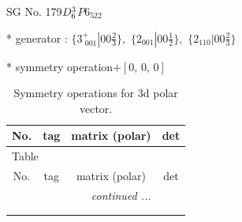 \documentclass[fleqn,8pt]{jsarticle}
\begin{document}
\setcounter{MaxMatrixCols}{32}

\renewcommand{\tablename}{Table~}
\renewcommand{\figurename}{Figure~}
\begin{center}
\LARGE
SG No. 179\quad$D_{\rm 6}^{3}$\quad$P6_522$\quad[ hexagonal ]
\end{center}

* generator : $\{3^{+}_{\,\,001}|0 0 \frac{2}{3}\},\,\,\{2{}_{001}|0 0 \frac{1}{2}\},\,\,\{2{}_{110}|0 0 \frac{2}{3}\}$

* symmetry operation\quad$+\left[ 0,\, 0,\, 0 \right]$
\renewcommand{\arraystretch}{1.3}
\begin{longtable}{cccc}
\caption{Symmetry operations for 3d polar vector.}
 \\
 \hline \hline
No. & tag & matrix (polar) & det \\ \hline \endfirsthead

\multicolumn{3}{l}{\tablename\ \thetable{}} \\
 \hline \hline
No. & tag & matrix (polar) & det \\ \hline \endhead

 \hline \hline
\multicolumn{3}{r}{\footnotesize\it continued ...} \\ \endfoot

 \hline \hline
\multicolumn{3}{r}{} \\ \endlastfoot


\end{longtable}
\end{document}

